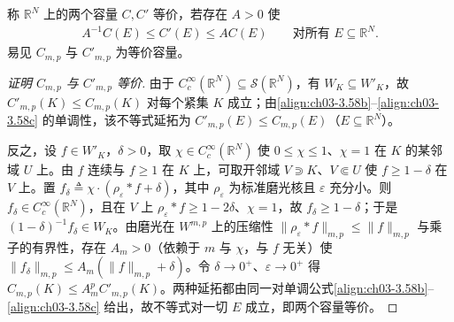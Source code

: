 \documentclass[../../main.tex]{subfiles}%
\begin{document}
称 $\mathbb{R}^N$ 上的两个容量 $C,C'$ 等价，若存在 $A>0$ 使
\begin{align*}
A^{-1}C(E)\leqslant C'(E)\leqslant AC(E)\qquad\text{对所有 }E\subseteq\mathbb{R}^N.
\end{align*}
易见 $C_{m,p}$ 与 $C'_{m,p}$ 为等价容量。

\begin{proof}[证明 $C_{m,p}$ 与 $C'_{m,p}$ 等价]
由于 $C^\infty_c(\mathbb{R}^N)\subseteq\mathcal{S}(\mathbb{R}^N)$，有 $W_K\subseteq W'_K$，故 $C'_{m,p}(K)\leqslant C_{m,p}(K)$ 对每个紧集 $K$ 成立；由\eqref{align:ch03-3.58b}--\eqref{align:ch03-3.58c} 的单调性，该不等式延拓为 $C'_{m,p}(E)\leqslant C_{m,p}(E)$（$E\subseteq\mathbb{R}^N$）。

反之，设 $f\in W'_K$，$\delta>0$，取 $\chi\in C^\infty_c(\mathbb{R}^N)$ 使 $0\leqslant\chi\leqslant1$、$\chi=1$ 在 $K$ 的某邻域 $U$ 上。由 $f$ 连续与 $f\geqslant1$ 在 $K$ 上，可取开邻域 $V\Supset K$、$V\Subset U$ 使 $f\geqslant1-\delta$ 在 $V$ 上。置 $f_\delta\triangleq\chi\cdot\left(\rho_\varepsilon*f+\delta\right)$，其中 $\rho_\varepsilon$ 为标准磨光核且 $\varepsilon$ 充分小。则 $f_\delta\in C^\infty_c(\mathbb{R}^N)$，且在 $V$ 上 $\rho_\varepsilon*f\geqslant1-2\delta$、$\chi=1$，故 $f_\delta\geqslant1-\delta$；于是 $(1-\delta)^{-1}f_\delta\in W_K$。由磨光在 $W^{m,p}$ 上的压缩性 $\|\rho_\varepsilon*f\|_{m,p}\leqslant\|f\|_{m,p}$ 与乘子的有界性，存在 $A_m>0$（依赖于 $m$ 与 $\chi$，与 $f$ 无关）使 $\|f_\delta\|_{m,p}\leqslant A_m(\|f\|_{m,p}+\delta)$。令 $\delta\to0^+$、$\varepsilon\to0^+$ 得 $C_{m,p}(K)\leqslant A_m^pC'_{m,p}(K)$。两种延拓都由同一对单调公式\eqref{align:ch03-3.58b}--\eqref{align:ch03-3.58c} 给出，故不等式对一切 $E$ 成立，即两个容量等价。
\end{proof}
\end{document}
